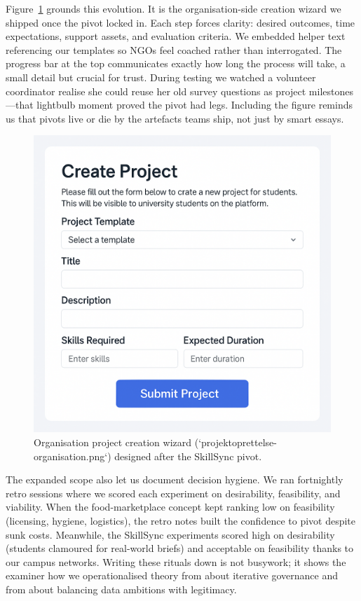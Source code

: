 Figure~\ref{fig:project-creation} grounds this evolution. It is the organisation-side creation wizard we shipped once the pivot locked in. Each step forces clarity: desired outcomes, time expectations, support assets, and evaluation criteria. We embedded helper text referencing our templates so NGOs feel coached rather than interrogated. The progress bar at the top communicates exactly how long the process will take, a small detail but crucial for trust. During testing we watched a volunteer coordinator realise she could reuse her old survey questions as project milestones---that lightbulb moment proved the pivot had legs. Including the figure reminds us that pivots live or die by the artefacts teams ship, not just by smart essays.

\begin{figure}[h]
  \centering
  \includegraphics[width=0.85\linewidth]{figures/opgave03/projektoprettelse-organisation.png}
  \caption{Organisation project creation wizard (`projektoprettelse-organisation.png`) designed after the SkillSync pivot.}
  \label{fig:project-creation}
\end{figure}

The expanded scope also let us document decision hygiene. We ran fortnightly retro sessions where we scored each experiment on desirability, feasibility, and viability. When the food-marketplace concept kept ranking low on feasibility (licensing, hygiene, logistics), the retro notes built the confidence to pivot despite sunk costs. Meanwhile, the SkillSync experiments scored high on desirability (students clamoured for real-world briefs) and acceptable on feasibility thanks to our campus networks. Writing these rituals down is not busywork; it shows the examiner how we operationalised theory from \citet{Choudary2016} about iterative governance and from \citet{Srnicek2017} about balancing data ambitions with legitimacy.
